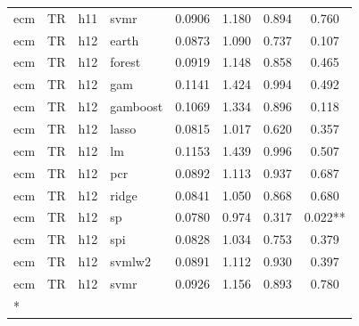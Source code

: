 \begin{ThreePartTable}
\begin{longtable}[t]{llclcccc}
ecm & TR & h11 & svmr & 0.0906 & 1.180 & 0.894 & 0.760\\
\addlinespace
ecm & TR & h12 & earth & 0.0873 & 1.090 & 0.737 & 0.107\\
ecm & TR & h12 & forest & 0.0919 & 1.148 & 0.858 & 0.465\\
ecm & TR & h12 & gam & 0.1141 & 1.424 & 0.994 & 0.492\\
ecm & TR & h12 & gamboost & 0.1069 & 1.334 & 0.896 & 0.118\\
ecm & TR & h12 & lasso & 0.0815 & 1.017 & 0.620 & 0.357\\
ecm & TR & h12 & lm & 0.1153 & 1.439 & 0.996 & 0.507\\
ecm & TR & h12 & pcr & 0.0892 & 1.113 & 0.937 & 0.687\\
ecm & TR & h12 & ridge & 0.0841 & 1.050 & 0.868 & 0.680\\
ecm & TR & h12 & sp & 0.0780 & 0.974 & 0.317 & 0.022**\\
ecm & TR & h12 & spi & 0.0828 & 1.034 & 0.753 & 0.379\\
ecm & TR & h12 & svmlw2 & 0.0891 & 1.112 & 0.930 & 0.397\\
ecm & TR & h12 & svmr & 0.0926 & 1.156 & 0.893 & 0.780\\*
\end{longtable}
\end{ThreePartTable}
\endgroup{}
